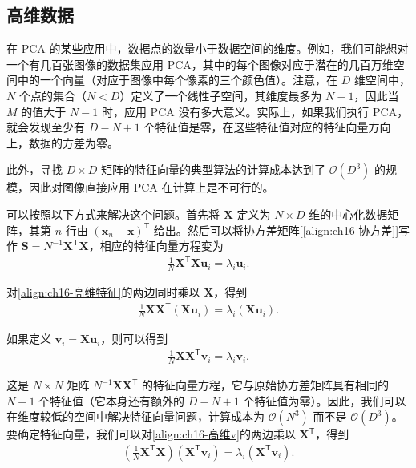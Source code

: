 \documentclass[../../main.tex]{subfiles}
\begin{document}
\subsection{高维数据}\label{subsection:ch16-高维数据}

在 PCA 的某些应用中，数据点的数量小于数据空间的维度。例如，我们可能想对一个有几百张图像的数据集应用 PCA，其中的每个图像对应于潜在的几百万维空间中的一个向量（对应于图像中每个像素的三个颜色值）。注意，在 $D$ 维空间中，$N$ 个点的集合（$N<D$）定义了一个线性子空间，其维度最多为 $N-1$，因此当 $M$ 的值大于 $N-1$ 时，应用 PCA 没有多大意义。实际上，如果我们执行 PCA，就会发现至少有 $D-N+1$ 个特征值是零，在这些特征值对应的特征向量方向上，数据的方差为零。

此外，寻找 $D\times D$ 矩阵的特征向量的典型算法的计算成本达到了 $\mathcal{O}(D^3)$ 的规模，因此对图像直接应用 PCA 在计算上是不可行的。

可以按照以下方式来解决这个问题。首先将 $\bm{X}$ 定义为 $N\times D$ 维的中心化数据矩阵，其第 $n$ 行由 $(\bm{x}_n-\bar{\bm{x}})^{\mathsf T}$ 给出。然后可以将协方差矩阵[\eqref{align:ch16-协方差}]写作 $\bm{S}=N^{-1}\bm{X}^{\mathsf T}\bm{X}$，相应的特征向量方程变为
\begin{align}
  \frac{1}{N}\bm{X}^{\mathsf T}\bm{X}\bm{u}_i=\lambda_i\bm{u}_i.
  \label{align:ch16-高维特征}
\end{align}

对\eqref{align:ch16-高维特征}的两边同时乘以 $\bm{X}$，得到
\begin{align}
  \frac{1}{N}\bm{X}\bm{X}^{\mathsf T}\left(\bm{X}\bm{u}_i\right)=\lambda_i\left(\bm{X}\bm{u}_i\right).
  \label{align:ch16-高维对偶}
\end{align}

如果定义 $\bm{v}_i=\bm{X}\bm{u}_i$，则可以得到
\begin{align}
  \frac{1}{N}\bm{X}\bm{X}^{\mathsf T}\bm{v}_i=\lambda_i\bm{v}_i.
  \label{align:ch16-高维v}
\end{align}

这是 $N\times N$ 矩阵 $N^{-1}\bm{X}\bm{X}^{\mathsf T}$ 的特征向量方程，它与原始协方差矩阵具有相同的 $N-1$ 个特征值（它本身还有额外的 $D-N+1$ 个特征值为零）。因此，我们可以在维度较低的空间中解决特征向量问题，计算成本为 $\mathcal{O}(N^3)$ 而不是 $\mathcal{O}(D^3)$。要确定特征向量，我们可以对\eqref{align:ch16-高维v}的两边乘以 $\bm{X}^{\mathsf T}$，得到
\begin{align}
  \left(\frac{1}{N}\bm{X}^{\mathsf T}\bm{X}\right)\left(\bm{X}^{\mathsf T}\bm{v}_i\right)=\lambda_i\left(\bm{X}^{\mathsf T}\bm{v}_i\right).
  \label{align:ch16-高维回代}
\end{align}
\end{document}
